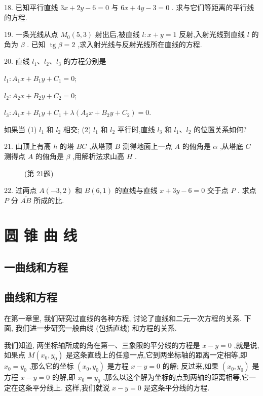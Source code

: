 \documentclass[lang=cn,newtx,12pt,scheme=chinese]{elegantbook}
\begin{document}
18. 已知平行直线 \({3x} + {2y} - 6 = 0\) 与 \({6x} + {4y} - 3 = 0\) . 求与它们等距离的平行线的方程.

19. 一条光线从点 \({M}_{0}\left( {5,3}\right)\) 射出后,被直线 \(l : x + y = 1\) 反射,入射光线到直线 \(l\) 的角为 \(\beta\) . 已知 \(\operatorname{tg}\beta = 2\) ,求入射光线与反射光线所在直线的方程.

20. 直线 \({l}_{1}\text{、}{l}_{2}\text{、}{l}_{3}\) 的方程分别是

\({l}_{1} : {A}_{1}x + {B}_{1}y + {C}_{1} = 0;\)

\({l}_{2} : {A}_{2}x + {B}_{2}y + {C}_{2} = 0;\)

\({l}_{3} : {A}_{1}x + {B}_{1}y + {C}_{1} + \lambda \left( {{A}_{2}x + {B}_{2}y + {C}_{2}}\right) = 0.\)

如果当 (1) \({l}_{1}\) 和 \({l}_{2}\) 相交; (2) \({l}_{1}\) 和 \({l}_{2}\) 平行时,直线 \({l}_{3}\) 和 \({l}_{1}\text{、}{l}_{2}\) 的位置关系如何?

21. 山顶上有高 \(h\) 的塔 \({BC}\) ,从塔顶 \(B\) 测得地面上一点 \(A\) 的俯角是 \(\alpha\) ,从塔底 \(C\) 测得点 \(A\) 的俯角是 \(\beta\) ,用解析法求山高 \(H\) .

\begin{figure}[h]
  \centering
  
  \caption{(第 21题)}
\end{figure}

22. 过两点 \(A\left( {-3,2}\right)\) 和 \(B\left( {6,1}\right)\) 的直线与直线 \(x + {3y} - 6 = 0\) 交于点 \(P\) . 求点 \(P\) 分 \(\overline{AB}\) 所成的比.


\chapter{圆 锥 曲 线}

\section*{一\text{ }曲线和方程}

\section{曲线和方程}

在第一章里, 我们研究过直线的各种方程, 讨论了直线和二元一次方程的关系. 下面, 我们进一步研究一般曲线 (包括直线) 和方程的关系.

我们知道, 两坐标轴所成的角在第一、三象限的平分线的方程是 \(x - y = 0\) ,就是说,如果点 \(M\left( {{x}_{0},{y}_{0}}\right)\) 是这条直线上的任意一点,它到两坐标轴的距离一定相等,即 \({x}_{0} = {y}_{0}\) ,那么它的坐标 \(\left( {{x}_{0},{y}_{0}}\right)\) 是方程 \(x - y = 0\) 的解; 反过来,如果 \(\left( {{x}_{0},{y}_{0}}\right)\) 是方程 \(x - y = 0\) 的解,即 \({x}_{0} = {y}_{0}\) ,那么以这个解为坐标的点到两轴的距离相等,它一定在这条平分线上. 这样,我们就说 \(x - y = 0\) 是这条平分线的方程.
\end{document}
